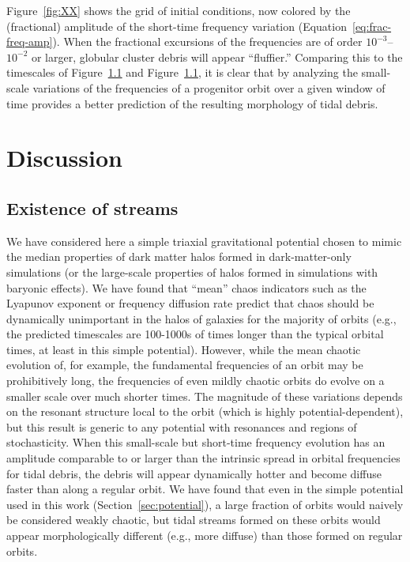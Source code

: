 \documentclass[letterpaper,12pt,preprint]{aastex}
\begin{document}
Figure~\ref{fig:XX} shows the grid of initial conditions, now colored by the (fractional) amplitude of the short-time frequency variation (Equation~\ref{eq:frac-freq-amp}). When the fractional excursions of the frequencies are of order $10^{-3}$--$10^{-2}$ or larger, globular cluster debris will appear ``fluffier.'' Comparing this to the timescales of Figure~\ref{} and Figure~\ref{}, it is clear that by analyzing the small-scale variations of the frequencies of a progenitor orbit over a given window of time provides a better prediction of the resulting morphology of tidal debris. 

\section{Discussion}\label{sec:discussion}

\subsection{Existence of streams}

We have considered here a simple triaxial gravitational potential chosen to mimic the median properties of dark matter halos formed in dark-matter-only simulations (or the large-scale properties of halos formed in simulations with baryonic effects). We have found that ``mean'' chaos indicators such as the Lyapunov exponent or frequency diffusion rate predict that chaos should be dynamically unimportant in the halos of galaxies for the majority of orbits (e.g., the predicted timescales are 100-1000s of times longer than the typical orbital times, at least in this simple potential). However, while the mean chaotic evolution of, for example, the fundamental frequencies of an orbit may be prohibitively long, the frequencies of even mildly chaotic orbits do evolve on a smaller scale over much shorter times. The magnitude of these variations depends on the resonant structure local to the orbit (which is highly potential-dependent), but this result is generic to any potential with resonances and regions of stochasticity. When this small-scale but short-time frequency evolution has an amplitude comparable to or larger than the intrinsic spread in orbital frequencies for tidal debris, the debris will appear dynamically hotter and become diffuse faster than along a regular orbit. We have found that even in the simple potential used in this work (Section~\ref{sec:potential}), a large fraction of orbits would naively be considered weakly chaotic, but tidal streams formed on these orbits would appear morphologically different (e.g., more diffuse) than those formed on regular orbits. 
\end{document}
